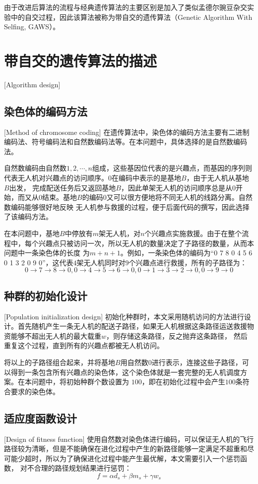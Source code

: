 由于改进后算法的流程与经典遗传算法的主要区别是加入了类似孟德尔豌豆杂交实验中的自交过程，因此该算法被称为带自交的遗传算法（Genetic Algorithm With Selfing, GAWS）。
\section{带自交的遗传算法的描述}[Algorithm design]

\subsection{染色体的编码方法}[Method of chromosome coding]
在遗传算法中，染色体的编码方法主要有二进制编码法、符号编码法和自然数编码法等。在本问题中，具体选择的是自然数编码法。


自然数编码由自然数$1,2,\cdots,n$组成，这些基因位代表的是兴趣点，而基因的序列则代表无人机对兴趣点的访问顺序。$0$在编码中表示的是基地$B$，由于无人机从基地$B$出发，
完成配送任务后又返回基地$B$，因此单架无人机的访问顺序总是从$0$开始，而又从$0$结束。基地$B$的编码$0$又可以很方便地将不同无人机的线路分离。自然数编码能够很好地反映
无人机参与救援的过程，便于后面代码的撰写，因此选择了该编码方法。


在本问题中，基地$B$中停放有$m$架无人机，对$n$个兴趣点实施救援。由于在整个流程中，每个兴趣点只被访问一次，所以无人机的数量决定了子路径的数量，从而本问题中一条染色体的长度
为$m+n+1$。例如，一条染色体的编码为``0 7 8 0 4 5 6 0 1 3 2 0 9 0''，这代表$4$架无人机同时对$9$个兴趣点进行救援，所有的子路径为：
$$0\rightarrow7\rightarrow8\rightarrow0,0\rightarrow4\rightarrow5\rightarrow6\rightarrow0,0\rightarrow1\rightarrow3\rightarrow2\rightarrow0,0\rightarrow9\rightarrow0$$

\subsection{种群的初始化设计}[Population initialization design]
初始化种群时，本文采用随机访问的方法进行设计。首先随机产生一条无人机的配送子路径，如果无人机根据这条路径运送救援物资能够不超出无人机的最大载重$w$，则存储这条路径，反之抛弃这条路径，
然后重复这个过程，直到所有的兴趣点都被无人机访问。


将以上的子路径组合起来，并将基地$B$用自然数$0$进行表示，连接这些子路径，可以得到一条包含所有兴趣点的染色体，这个染色体就是一套完整的无人机调度方案。在本问题中，将初始种群个数设置为
$100$，即在初始化过程中会产生$100$条符合要求的染色体。

\subsection{适应度函数设计}[Design of fitness function]
使用自然数对染色体进行编码，可以保证无人机的飞行路径较为清晰，但是不能确保在进化过程中产生的新路径能够一定满足不超重和尽可能少超时，所以为了确保进化过程中能产生最优解，本文需要引入一个惩罚函数，
对不合理的路径规划结果进行惩罚：
\begin{equation}
	f= \alpha d_s + \beta m_s + \gamma w_s
\end{equation}

